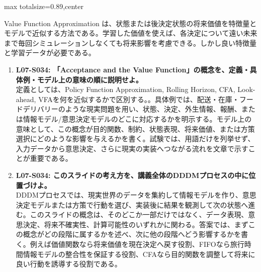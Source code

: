 \begin{minipage}[t]{0.58\textwidth}
\begin{adjustbox}{max totalsize={\textwidth}{0.89\textheight},center}
\begin{minipage}{\textwidth}
Value Function Approximation は、状態または後決定状態の将来価値を特徴量とモデルで近似する方法である。学習した価値を使えば、各決定について遠い未来まで毎回シミュレーションしなくても将来影響を考慮できる。しかし良い特徴量と学習データが必要である。\par{}\begin{enumerate}\item \textbf{L07-S034: 「Acceptance and the Value Function」の概念を、定義・具体例・モデル上の意味の順に説明せよ。}\\定義としては、Policy Function Approximation, Rolling Horizon, CFA, Look-ahead, VFAを何を近似するかで区別する。。具体例では、配送・在庫・フードデリバリーのような現実問題を用い、状態、決定、外生情報、報酬、または情報モデル/意思決定モデルのどこに対応するかを明示する。モデル上の意味として、この概念が目的関数、制約、状態表現、将来価値、または方策選択にどのような影響を与えるかを書く。試験では、用語だけを列挙せず、入力データから意思決定、さらに現実の実装へつながる流れを文章で示すことが重要である。\item \textbf{L07-S034: このスライドの考え方を、講義全体のDDDMプロセスの中に位置づけよ。}\\DDDMプロセスでは、現実世界のデータを集約して情報モデルを作り、意思決定モデルまたは方策で行動を選び、実装後に結果を観測して次の状態へ進む。このスライドの概念は、そのどこか一部だけではなく、データ表現、意思決定、将来不確実性、計算可能性のいずれかに関わる。答案では、まずこの概念がどの段階に属するかを述べ、次に他の段階へどう影響するかを書く。例えば価値関数なら将来価値を現在決定へ戻す役割、FIFOなら旅行時間情報モデルの整合性を保証する役割、CFAなら目的関数を調整して将来に良い行動を誘導する役割である。\end{enumerate}
\end{minipage}
\end{adjustbox}
\end{minipage}


